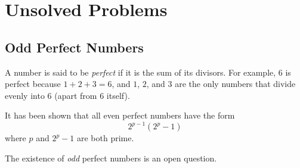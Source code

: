 \documentclass{report}
\begin{document}
\chapter{Unsolved Problems}

\section{Odd Perfect Numbers}

A number is said to be \emph{perfect} if it
is the sum of its divisors.  For example, $6$ is
perfect because \(1+2+3 = 6\), and $1$, $2$, and $3$
are the only numbers that divide evenly into $6$ 
(apart from 6 itself).

It has been shown that all even perfect numbers
have the form \[2^{p-1}(2^{p}-1)\] where $p$
and \(2^{p}-1\) are both prime.

The existence of \emph{odd} perfect numbers is 
an open question.
\end{document}
